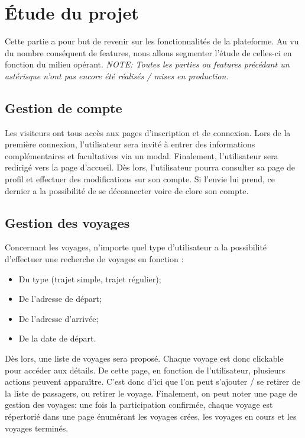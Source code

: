 
\section{Étude du projet}

Cette partie a pour but de revenir sur les fonctionnalités de la plateforme. Au vu du nombre conséquent de features, nous allons segmenter l'étude de celles-ci en fonction du milieu opérant. \newline
\textit{NOTE: Toutes les parties ou features précédant un astérisque n'ont pas encore été réalisés / mises en production.}


\subsection{Gestion de compte}

Les visiteurs ont tous accès aux pages d'inscription et de connexion. Lors de la première connexion, l'utilisateur sera invité à entrer des informations complémentaires et facultatives via un modal. Finalement, l'utilisateur sera redirigé vers la page d'accueil. 
Dès lors, l'utilisateur pourra consulter sa page de profil et effectuer des modifications sur son compte. Si l'envie lui prend, ce dernier a la possibilité de se déconnecter voire de clore son compte.

\subsection{Gestion des voyages}

Concernant les voyages, n'importe quel type d'utilisateur a la possibilité d'effectuer une recherche de voyages en fonction :

\begin{itemize}
  \item Du type (trajet simple, trajet régulier);
  \item De l'adresse de départ;
  \item De l'adresse d'arrivée;
  \item De la date de départ.
\end{itemize}

Dès lors, une liste de voyages sera proposé. Chaque voyage est donc clickable pour accéder aux détails. De cette page, en fonction de l'utilisateur, plusieurs actions peuvent apparaître. C'est donc d'ici que l'on peut s'ajouter / se retirer de la liste de passagers, ou retirer le voyage.
Finalement, on peut noter une page de gestion des voyages: une fois la participation confirmée, chaque voyage est répertorié dans une page énumérant les voyages crées, les voyages en cours et les voyages terminés.

